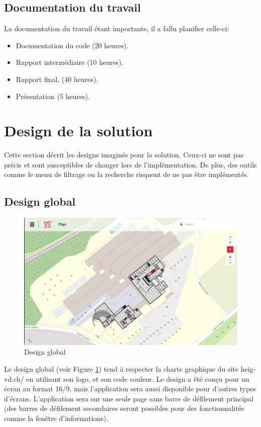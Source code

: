 \documentclass[
    iai, %
    il, %
]{heig-tb}
\begin{document}
\subsection{Documentation du travail}
La documentation du travail étant importante, il a fallu planifier celle-ci:

\begin{itemize}
    \item Documentation du code (20 heures).
    \item Rapport intermédiaire (10 heures).
    \item Rapport final, (40 heures).
    \item Présentation (5 heures).
\end{itemize}

\section{Design de la solution}

Cette section décrit les designs imaginés pour la solution.
Ceux-ci ne sont pas précis et sont susceptibles de changer lors de l'implémentation.
De plus, des outils comme le menu de filtrage ou la recherche risquent de ne pas être implémentés.

\subsection{Design global}

\begin{figure}[H]
    \centering
    \includegraphics[scale=0.35]{designGlobal.png}
    \caption{Design global}
    \label{fig:globalDesign}
\end{figure}

Le design global (voir Figure \ref{fig:globalDesign}) tend à respecter la charte graphique du site heig-vd.ch/ en utilisant son logo, et son code couleur.
Le design a été conçu pour un écran au format 16/9, mais l'application sera aussi disponible pour d'autres types d'écrans.
L'application sera sur une seule page sans barre de défilement principal
(des barres de défilement secondaires seront possibles pour des fonctionnalités comme la fenêtre d'informations).
\end{document}
